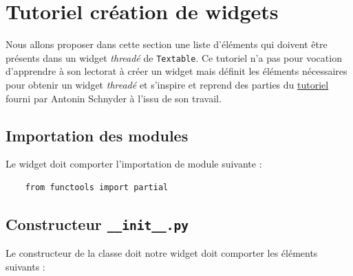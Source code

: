 \documentclass{article}
\begin{document}
\section{Tutoriel création de widgets}

Nous allons proposer dans cette section une liste d'éléments qui doivent être présents dans un widget \textit{threadé} de \texttt{Textable}. Ce tutoriel n'a pas pour vocation d'apprendre à son lectorat à créer un widget mais définit les éléments nécessaires pour obtenir un widget \textit{threadé} et s'inspire et reprend des parties du \href{https://docs.google.com/document/d/1QtXm2aYMZXAyM7mfBTqxt_XrTNFqC7e3aqy7OC1A_18/edit#heading=h.xyhgv3cij1d7}{tutoriel} fourni par Antonin Schnyder à l'issu de son travail.

\subsection{Importation des modules}

Le widget doit comporter l'importation de module suivante : 

\begin{verbatim}
    from functools import partial
\end{verbatim}

\subsection{Constructeur \texttt{\_\_init\_\_.py}}

Le constructeur de la classe doit notre widget doit comporter les éléments suivants : 
\end{document}
